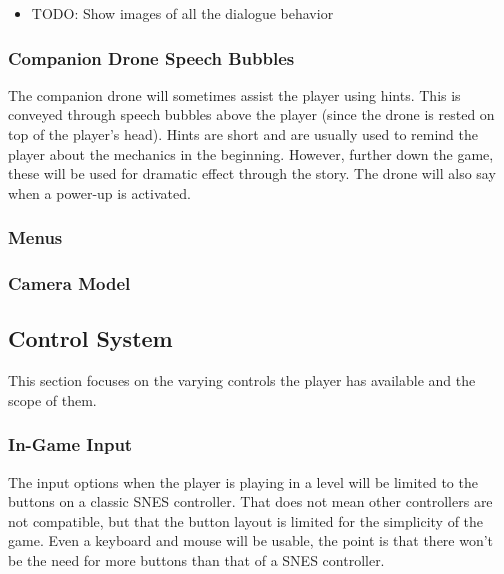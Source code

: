 \documentclass[12pt]{article}
\begin{document}
\begin{itemize}
	\item TODO: Show images of all the dialogue behavior
\end{itemize}

\subsubsection{Companion Drone Speech Bubbles}

The companion drone will sometimes assist the player using hints. This is conveyed through speech bubbles above the player (since the drone is rested on top of the player's head). Hints are short and are usually used to remind the player about the mechanics in the beginning. However, further down the game, these will be used for dramatic effect through the story. The drone will also say when a power-up is activated. 

\subsubsection{Menus}

\subsubsection{Camera Model}

\subsection{Control System}

This section focuses on the varying controls the player has available and the scope of them. 

\subsubsection{In-Game Input}

The input options when the player is playing in a level will be limited to the buttons on a classic SNES controller. That does not mean other controllers are not compatible, but that the button layout is limited for the simplicity of the game. Even a keyboard and mouse will be usable, the point is that there won't be the need for more buttons than that of a SNES controller. 
\end{document}
